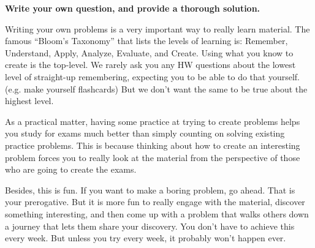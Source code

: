 {\bf Write your own question, and provide a thorough solution.}

Writing your own problems is a very important way to really learn
material. The famous ``Bloom's Taxonomy'' that lists the levels of
learning is: Remember, Understand, Apply, Analyze, Evaluate, and
Create. Using what you know to create is the top-level. We rarely ask
you any HW questions about the lowest level of straight-up
remembering, expecting you to be able to do that yourself. (e.g. make
yourself flashcards) But we don't want the same to be true about the
highest level.

As a practical matter, having some practice at trying to create
problems helps you study for exams much better than simply counting on
solving existing practice problems. This is because thinking about how
to create an interesting problem forces you to really look at the
material from the perspective of those who are going to create the
exams. 

Besides, this is fun. If you want to make a boring problem, go
ahead. That is your prerogative. But it is more fun to really engage
with the material, discover something interesting, and then come up
with a problem that walks others down a journey that lets them share
your discovery. You don't have to achieve this every week. But unless
you try every week, it probably won't happen ever. 